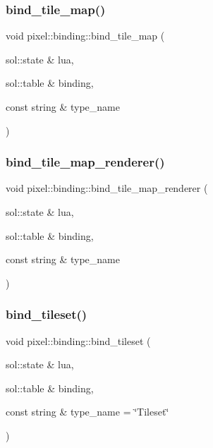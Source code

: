 \mbox{\label{namespacepixel_1_1binding_a2e196ac7c3331bd6d70bf4832fe3e0a4}} 
\subsubsection{\texorpdfstring{bind\+\_\+tile\+\_\+map()}{bind\_tile\_map()}}
{\footnotesize\ttfamily void pixel\+::binding\+::bind\+\_\+tile\+\_\+map (\begin{DoxyParamCaption}\item[{sol\+::state \&}]{lua,  }\item[{sol\+::table \&}]{binding,  }\item[{const string \&}]{type\+\_\+name }\end{DoxyParamCaption})}

\mbox{\label{namespacepixel_1_1binding_a2cb37d36e82884138762de826c9160cd}} 
\subsubsection{\texorpdfstring{bind\+\_\+tile\+\_\+map\+\_\+renderer()}{bind\_tile\_map\_renderer()}}
{\footnotesize\ttfamily void pixel\+::binding\+::bind\+\_\+tile\+\_\+map\+\_\+renderer (\begin{DoxyParamCaption}\item[{sol\+::state \&}]{lua,  }\item[{sol\+::table \&}]{binding,  }\item[{const string \&}]{type\+\_\+name }\end{DoxyParamCaption})}

\mbox{\label{namespacepixel_1_1binding_af8bd42a777032db179b42a8cbf5d26df}} 
\subsubsection{\texorpdfstring{bind\+\_\+tileset()}{bind\_tileset()}}
{\footnotesize\ttfamily void pixel\+::binding\+::bind\+\_\+tileset (\begin{DoxyParamCaption}\item[{sol\+::state \&}]{lua,  }\item[{sol\+::table \&}]{binding,  }\item[{const string \&}]{type\+\_\+name = {\ttfamily \char`\"{}Tileset\char`\"{}} }\end{DoxyParamCaption})}

